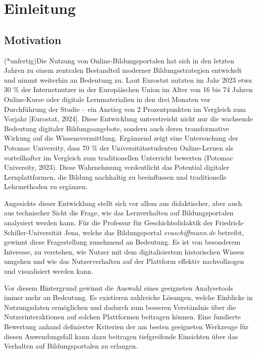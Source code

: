 \chapter{Einleitung}
\label{ch:einleitung}

\section{Motivation}
\label{sec:motivation}

(*unfertig)Die Nutzung von Online-Bildungsportalen hat sich in den letzten Jahren zu einem zentralen Bestandteil moderner Bildungsstrategien entwickelt und nimmt weiterhin an Bedeutung zu. Laut Eurostat nutzten im Jahr 2023 etwa 30 \% der Internetnutzer in der Europäischen Union im Alter von 16 bis 74 Jahren Online-Kurse oder digitale Lernmaterialien in den drei Monaten vor Durchführung der Studie – ein Anstieg von 2 Prozentpunkten im Vergleich zum Vorjahr [Eurostat, 2024]. Diese Entwicklung unterstreicht nicht nur die wachsende Bedeutung digitaler Bildungsangebote, sondern auch deren transformative Wirkung auf die Wissensvermittlung. Ergänzend zeigt eine Untersuchung der Potomac University, dass 70 \% der Universitätsstudenten Online-Lernen als vorteilhafter im Vergleich zum traditionellen Unterricht bewerten (Potomac University, 2023). Diese Wahrnehmung verdeutlicht das Potential digitaler Lernplattformen, die Bildung nachhaltig zu beeinflussen und traditionelle Lehrmethoden zu ergänzen.

Angesichts dieser Entwicklung stellt sich vor allem aus didaktischer, aber auch aus technischer Sicht die Frage, wie das Lernverhalten auf Bildungsportalen analysiert werden kann. Für die Professur für Geschichtsdidaktik der Friedrich-Schiller-Universität Jena, welche das Bildungsportal \textit{evaschiffmann.de} betreibt, gewinnt diese Fragestellung zunehmend an Bedeutung. Es ist von besonderem Interesse, zu verstehen, wie Nutzer mit dem digitalisiertem historischen Wissen umgehen und wie das Nutzerverhalten auf der Plattform effektiv nachvollzogen und visualisiert werden kann.

Vor diesem Hintergrund gewinnt die Auswahl eines geeigneten Analysetools
immer mehr an Bedeutung. Es existieren zahlreiche Lösungen, welche
Einblicke in Nutzungsdaten ermöglichen und dadurch zum besseren Verständnis 
über die Nutzerinteraktionen auf solchen Plattformen beitragen können. 
Eine fundierte Bewertung anhand definierter Kriterien der am besten geeigneten Werkzeuge 
für diesen Anwendungsfall kann dazu beitragen tiefgreifende Einsichten über das Verhalten auf 
Bildungsportalen zu erlangen.

